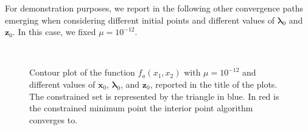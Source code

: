 \documentclass[a4paper,11pt]{article}
\begin{document}
\noindent For demonstration purposes, we report in the following other convergence paths emerging when considering different initial points and different values of $\boldsymbol{\lambda}_{0}$ and $\textbf{z}_{0}$. In this case, we fixed $\mu=10^{-12}$.
\begin{figure}[H]
	\centering
	 \
	\caption{Contour plot of the function $f_{a}(x_{1},x_{2})$ with $\mu=10^{-12}$ and different values of $\textbf{x}_{0}$, $\boldsymbol{\lambda}_{0}$, and $\textbf{z}_{0}$, reported in the title of the plots. The constrained set is represented by the triangle in blue. In red is the constrained minimum point the interior point algorithm converges to.}
	\label{Fig:func_a_diff_x0}
\end{figure}
\end{document}
